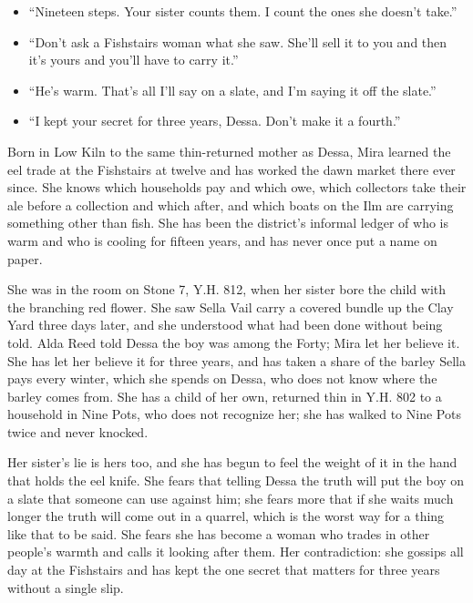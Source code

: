 \documentclass{design/chronicle}
\begin{document}
{\begin{itemize}[leftmargin=1.4em,itemsep=1pt,topsep=3pt,parsep=0pt]
\item “Nineteen steps. Your sister counts them. I count the ones she doesn’t take.”

\item “Don’t ask a Fishstairs woman what she saw. She’ll sell it to you and then it’s yours and you’ll have to carry it.”

\item “He’s warm. That’s all I’ll say on a slate, and I’m saying it off the slate.”

\item “I kept your secret for three years, Dessa. Don’t make it a fourth.”

\end{itemize}

Born in Low Kiln to the same thin-returned mother as Dessa, Mira learned the eel trade at the Fishstairs at twelve and has worked the dawn market there ever since. She knows which households pay and which owe, which collectors take their ale before a collection and which after, and which boats on the Ilm are carrying something other than fish. She has been the district’s informal ledger of who is warm and who is cooling for fifteen years, and has never once put a name on paper.

She was in the room on Stone 7, Y.H. 812, when her sister bore the child with the branching red flower. She saw Sella Vail carry a covered bundle up the Clay Yard three days later, and she understood what had been done without being told. Alda Reed told Dessa the boy was among the Forty; Mira let her believe it. She has let her believe it for three years, and has taken a share of the barley Sella pays every winter, which she spends on Dessa, who does not know where the barley comes from. She has a child of her own, returned thin in Y.H. 802 to a household in Nine Pots, who does not recognize her; she has walked to Nine Pots twice and never knocked.

Her sister’s lie is hers too, and she has begun to feel the weight of it in the hand that holds the eel knife. She fears that telling Dessa the truth will put the boy on a slate that someone can use against him; she fears more that if she waits much longer the truth will come out in a quarrel, which is the worst way for a thing like that to be said. She fears she has become a woman who trades in other people’s warmth and calls it looking after them. Her contradiction: she gossips all day at the Fishstairs and has kept the one secret that matters for three years without a single slip.

}
\end{document}
